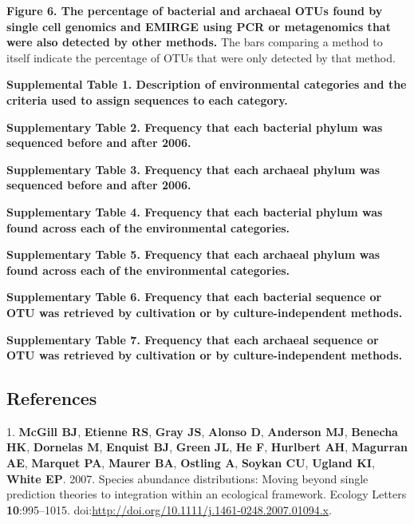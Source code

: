 \documentclass[11pt,]{article}
\begin{document}
\textbf{Figure 6. The percentage of bacterial and archaeal OTUs found by
single cell genomics and EMIRGE using PCR or metagenomics that were also
detected by other methods.} The bars comparing a method to itself
indicate the percentage of OTUs that were only detected by that method.

\newpage

\textbf{Supplemental Table 1. Description of environmental categories
and the criteria used to assign sequences to each category.}

\textbf{Supplementary Table 2. Frequency that each bacterial phylum was
sequenced before and after 2006.}

\textbf{Supplementary Table 3. Frequency that each archaeal phylum was
sequenced before and after 2006.}

\textbf{Supplementary Table 4. Frequency that each bacterial phylum was
found across each of the environmental categories.}

\textbf{Supplementary Table 5. Frequency that each archaeal phylum was
found across each of the environmental categories.}

\textbf{Supplementary Table 6. Frequency that each bacterial sequence or
OTU was retrieved by cultivation or by culture-independent methods.}

\textbf{Supplementary Table 7. Frequency that each archaeal sequence or
OTU was retrieved by cultivation or by culture-independent methods.}

\newpage

\subsection*{References}\label{references}

1. \textbf{McGill BJ}, \textbf{Etienne RS}, \textbf{Gray JS},
\textbf{Alonso D}, \textbf{Anderson MJ}, \textbf{Benecha HK},
\textbf{Dornelas M}, \textbf{Enquist BJ}, \textbf{Green JL}, \textbf{He
F}, \textbf{Hurlbert AH}, \textbf{Magurran AE}, \textbf{Marquet PA},
\textbf{Maurer BA}, \textbf{Ostling A}, \textbf{Soykan CU},
\textbf{Ugland KI}, \textbf{White EP}. 2007. Species abundance
distributions: Moving beyond single prediction theories to integration
within an ecological framework. Ecology Letters \textbf{10}:995--1015.
doi:\url{http://doi.org/10.1111/j.1461-0248.2007.01094.x}.
\end{document}

